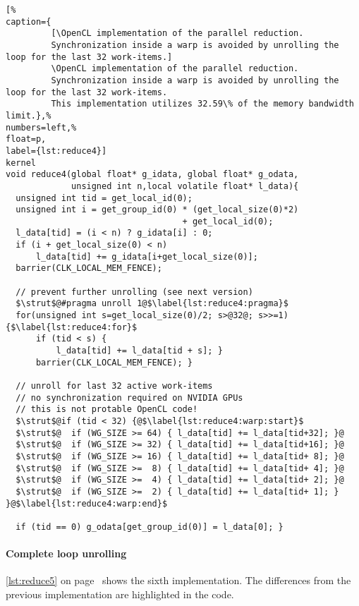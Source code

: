 \begin{lstlisting}[%
caption={
         [\OpenCL implementation of the parallel reduction.
         Synchronization inside a warp is avoided by unrolling the loop for the last 32 work-items.]
         \OpenCL implementation of the parallel reduction.
         Synchronization inside a warp is avoided by unrolling the loop for the last 32 work-items.
         This implementation utilizes 32.59\% of the memory bandwidth limit.},%
numbers=left,%
float=p,
label={lst:reduce4}]
kernel
void reduce4(global float* g_idata, global float* g_odata,
             unsigned int n,local volatile float* l_data){
  unsigned int tid = get_local_id(0);
  unsigned int i = get_group_id(0) * (get_local_size(0)*2)
                                   + get_local_id(0);
  l_data[tid] = (i < n) ? g_idata[i] : 0;
  if (i + get_local_size(0) < n)
      l_data[tid] += g_idata[i+get_local_size(0)];
  barrier(CLK_LOCAL_MEM_FENCE);

  // prevent further unrolling (see next version)
  $\strut$@#pragma unroll 1@$\label{lst:reduce4:pragma}$
  for(unsigned int s=get_local_size(0)/2; s>@32@; s>>=1) {$\label{lst:reduce4:for}$
      if (tid < s) {
          l_data[tid] += l_data[tid + s]; }
      barrier(CLK_LOCAL_MEM_FENCE); }

  // unroll for last 32 active work-items
  // no synchronization required on NVIDIA GPUs
  // this is not protable OpenCL code!
  $\strut$@if (tid < 32) {@$\label{lst:reduce4:warp:start}$
  $\strut$@  if (WG_SIZE >= 64) { l_data[tid] += l_data[tid+32]; }@
  $\strut$@  if (WG_SIZE >= 32) { l_data[tid] += l_data[tid+16]; }@
  $\strut$@  if (WG_SIZE >= 16) { l_data[tid] += l_data[tid+ 8]; }@
  $\strut$@  if (WG_SIZE >=  8) { l_data[tid] += l_data[tid+ 4]; }@
  $\strut$@  if (WG_SIZE >=  4) { l_data[tid] += l_data[tid+ 2]; }@
  $\strut$@  if (WG_SIZE >=  2) { l_data[tid] += l_data[tid+ 1]; } }@$\label{lst:reduce4:warp:end}$

  if (tid == 0) g_odata[get_group_id(0)] = l_data[0]; }
\end{lstlisting}

\paragraph{Complete loop unrolling}

\autoref{lst:reduce5} on page~\pageref{lst:reduce5} shows the sixth implementation.
The differences from the previous implementation are highlighted in the code.

